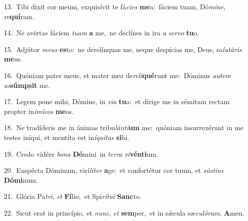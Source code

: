 {\numbfont\textcolor{\numbcolor}{13.}}~Tibi dixit cor meum, exquisívit te fá\-\textit{ci}\-\textit{es} \textbf{me}\-a:~\star fáciem tuam, Dó\-\textit{mi}\-\textit{ne}, \textit{re}\-\textbf{quí}ram.\par
{\numbfont\textcolor{\numbcolor}{14.}}~Ne avértas fáciem \textit{tu}\-\textit{am} \textbf{a} me,~\star ne declínes in ira \textit{a} \textit{ser}\-\textit{vo} \textbf{tu}\-o.\par
{\numbfont\textcolor{\numbcolor}{15.}}~Adjútor \textit{me}\-\textit{us} \textbf{es}\-to:~\star ne derelínquas me, neque despícias me, Deus, sa\-\textit{lu}\-\textit{tá}\textit{ris} \textbf{me}\-us.\par
{\numbfont\textcolor{\numbcolor}{16.}}~Quóniam pater meus, et mater mea de\-\textit{re}\-\textit{li}\textbf{qué}runt me:~\star Dóminus \textit{au}\-\textit{tem} \textit{as}\-\textbf{súmp}\textbf{sit} me.\par
{\numbfont\textcolor{\numbcolor}{17.}}~Legem pone mihi, Dómine, in \textit{vi}\-\textit{a} \textbf{tu}\-a:~\star et dírige me in sémitam rectam propter in\-\textit{i}\-\textit{mí}\textit{cos} \textbf{me}\-os.\par
{\numbfont\textcolor{\numbcolor}{18.}}~Ne tradíderis me in ánimas tribu\-\textit{lán}\-\textit{ti}\textbf{um} me:~\star quóniam insurrexérunt in me testes iníqui, et mentíta est in\-\textit{í}\-\textit{qui}\textit{tas} \textbf{si}\-bi.\par
{\numbfont\textcolor{\numbcolor}{19.}}~Credo vidére \textit{bo}\-\textit{na} \textbf{Dó}\-mini~\star in \textit{ter}\-\textit{ra} \textit{vi}\-\textbf{vén}\textbf{ti}um.\par
{\numbfont\textcolor{\numbcolor}{20.}}~Exspécta Dóminum, virí\-\textit{li}\-\textit{ter} \textbf{a}\-ge:~\star et confortétur cor tuum, et \textit{sús}\-\textit{ti}\textit{ne} \textbf{Dó}\-\textbf{mi}num.\par
{\numbfont\textcolor{\numbcolor}{21.}}~Glória Pa\-\textit{tri}\-, \textit{et} \textbf{Fí}\-lio,~\star et Spi\-\textit{rí}\-\textit{tu}\textit{i} \textbf{Sanc}\-to.\par
{\numbfont\textcolor{\numbcolor}{22.}}~Sicut erat in princípio, et \textit{nunc}\-, \textit{et} \textbf{sem}\-per,~\star et in sǽcula sæ\-\textit{cu}\-\textit{ló}\textit{rum}. \textbf{A}\-men.\par
